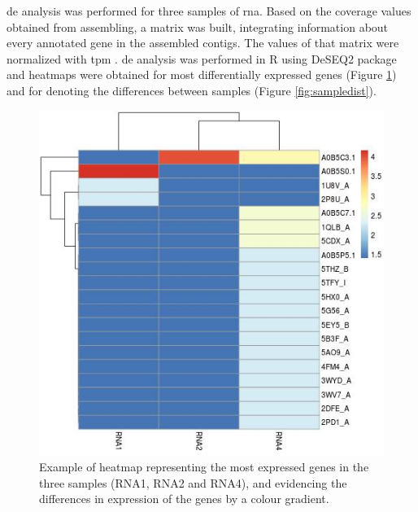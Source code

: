 \documentclass[
  oneside,
  11pt, a4paper,
  footinclude=true,
  headinclude=true,
  cleardoublepage=empty
]{scrbook}
\begin{document}
    \gls{de} analysis was performed for three samples of \gls{rna}. Based on the coverage values obtained from assembling, a matrix was built, integrating information about every annotated gene in the assembled contigs. The values of that matrix were normalized with \gls{tpm} \citep{conesa2016survey}. \gls{de} analysis was performed in R using DeSEQ2 package and heatmaps were obtained for most differentially expressed genes (Figure \ref{fig:mainexpression}) and for denoting the differences between samples (Figure \ref{fig:sampledist}).
    
    \begin{figure}[!h]    
    \includegraphics[width=\columnwidth]{FiguresUndTables/Results/Analyzing/mainexpression.jpg}
    \caption{Example of heatmap representing the most expressed genes in the three samples (RNA1, RNA2 and RNA4), and evidencing the differences in expression of the genes by a colour gradient.}
    \label{fig:mainexpression}
    \end{figure}
    
\end{document}
